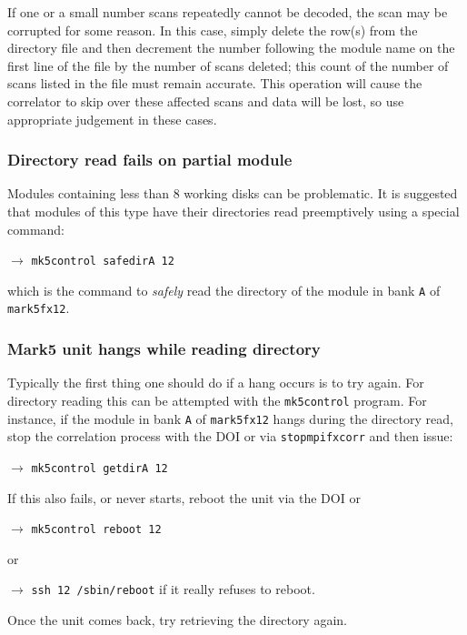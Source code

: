 If one or a small number scans repeatedly cannot be decoded, the scan may be corrupted for some reason.
In this case, simply delete the row(s) from the directory file and then decrement the number following the module name on the first line of the file by the number of scans deleted; this count of the number of scans listed in the file must remain accurate.
This operation will cause the correlator to skip over these affected scans and data will be lost, so use appropriate judgement in these cases.

\subsubsection{Directory read fails on partial module}

Modules containing less than 8 working disks can be problematic.  
It is suggested that modules of this type have their directories read
preemptively using a special command:

\noindent
$\longrightarrow$ {\tt mk5control safedirA 12}

\noindent
which is the command to {\em safely} read the directory of the module in bank {\tt A} of {\tt mark5fx12}.

\subsubsection{Mark5 unit hangs while reading directory}

Typically the first thing one should do if a hang occurs is to try again.
For directory reading this can be attempted with the {\tt mk5control} program.
For instance, if the module in bank {\tt A} of {\tt mark5fx12} hangs during the directory read, stop the correlation process with the DOI or via {\tt stopmpifxcorr} and then issue:

\noindent
$\longrightarrow$ {\tt mk5control getdirA 12}

\noindent
If this also fails, or never starts, reboot the unit via the DOI or

\noindent
$\longrightarrow$ {\tt mk5control reboot 12}

\noindent
or

\noindent
$\longrightarrow$ {\tt ssh 12 /sbin/reboot} if it really refuses to reboot.

Once the unit comes back, try retrieving the directory again.


